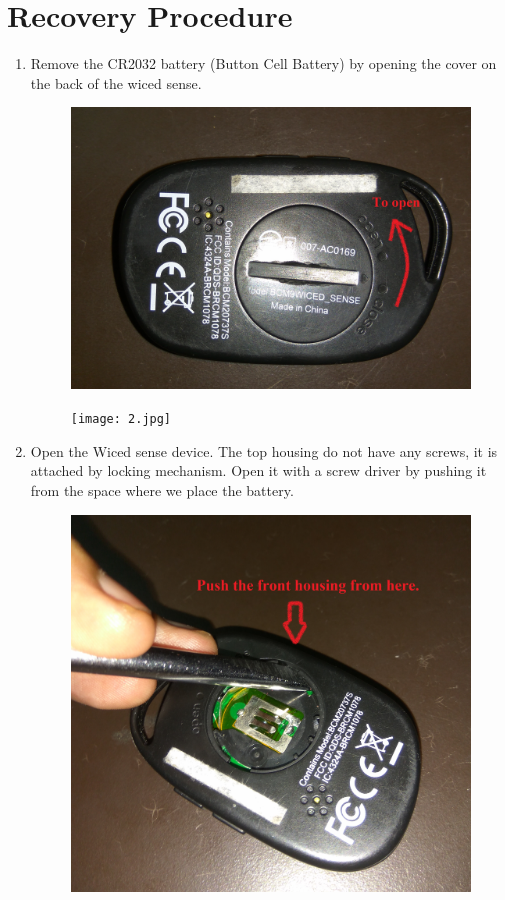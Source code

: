 \documentclass[11pt,a4paper]{article}
\begin{document}
\section{Recovery Procedure}
	\begin{enumerate}
	  \item Remove the CR2032 battery (Button Cell Battery) by opening the cover on the back of the wiced sense.
	  \begin{figure}[h]
        \centering
    	\includegraphics[scale=0.05]{1.jpg}
    		\caption{}
	    \end{figure}
	     \begin{figure}[h]
        \centering
    	\texttt{[image: 2.jpg]}
    		\caption{}
	    \end{figure}
	  \item Open the Wiced sense device. The top housing do not have any screws, it is attached by locking mechanism. Open it with a screw driver by pushing it from the space where we place the battery.
	  
	   \begin{figure}[h]
        \centering
    	\includegraphics[scale=0.05]{3.jpg}
    	\caption{}
	    \end{figure}
	  

\end{enumerate}
\end{document}

